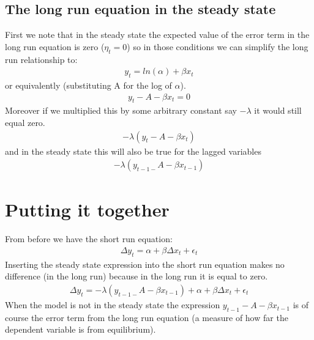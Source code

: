 \documentclass[letterpaper,10pt,english]{jupyterBook}
\begin{document}
\subsection{The long run equation in the steady state}
\label{\detokenize{content/06_WBModels/LoadingWBModel:the-long-run-equation-in-the-steady-state}}
\sphinxAtStartPar
First we note that in the steady state the expected value of the error term in the long run equation is zero (\(\eta_t=0 \)) so in those conditions we can simplify the long run relationship to:
\begin{equation*}
\begin{split}y_t=ln⁡(α)+\beta x_t\end{split}
\end{equation*}
\sphinxAtStartPar
or equivalently (substituting A for the log of \(\alpha\)).
\begin{equation*}
\begin{split}y_t-A-βx_t=0\end{split}
\end{equation*}
\sphinxAtStartPar
Moreover if we multiplied this by some arbitrary constant say \(-\lambda\) it would still equal zero.
\begin{equation*}
\begin{split}-\lambda(y_t -A-βx_t)\end{split}
\end{equation*}
\sphinxAtStartPar
and in the steady state this will also be true for the lagged variables
\begin{equation*}
\begin{split}-\lambda(y_{t-1-} A - βx_{t-1})\end{split}
\end{equation*}

\section{Putting it together}
\label{\detokenize{content/06_WBModels/LoadingWBModel:putting-it-together}}
\sphinxAtStartPar
From before we have the short run equation:
\begin{equation*}
\begin{split}\Delta y_t = \alpha + \beta \Delta x_t +\epsilon_t\end{split}
\end{equation*}
\sphinxAtStartPar
Inserting the steady state expression into the short run equation makes no difference (in the long run) because in the long run it is equal to zero.
\begin{equation*}
\begin{split}\Delta y_t = -\lambda(y_{t-1-}A-βx_{t-1})  + \alpha + \beta \Delta x_t +\epsilon_t\end{split}
\end{equation*}
\sphinxAtStartPar
When the model is not in the steady state the expression \(y_{t-1}-A-βx_{t-1}\) is of course the error term from the long run equation (a measure of how far the dependent variable is from equilibrium).
\end{document}
